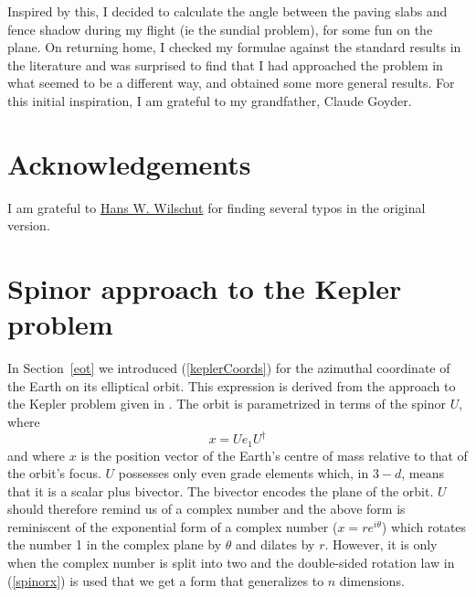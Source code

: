 \documentclass[12pt]{article}
\begin{document}
Inspired by this, I decided to calculate the angle between the paving slabs and fence shadow during my flight (ie the sundial problem), for some fun on the plane. On returning home, I checked my formulae against the standard results in the literature and was surprised to find that I had approached the problem in what seemed to be a different way, and obtained some more general results. For this initial inspiration, I am grateful to my grandfather, Claude Goyder.
%
\section*{Acknowledgements}
%
I am grateful to \href{https://sites.google.com/view/hanswilschut/home}{Hans W. Wilschut} for finding several typos in the original version.
%
\clearpage
%
\appendix 
\section{Spinor approach to the Kepler problem} \label{kepler}
%
In Section~\ref{eot} we introduced (\ref{keplerCoords}) for the azimuthal coordinate of the Earth on its elliptical orbit. This expression is derived from the approach to the Kepler problem given in \cite{GAbook}. The orbit is parametrized in terms of the spinor $U$, where
%
\begin{equation} \label{spinorx}
x = U e_1 U^\dag
\end{equation}
%
and where $x$ is the position vector of the Earth's centre of mass relative to that of the orbit's focus. $U$ possesses only even grade elements which, in $3-d$, means that it is a scalar plus bivector. The bivector encodes the plane of the orbit. $U$ should therefore remind us of a complex number and the above form is reminiscent of the exponential form of a complex number ($x = re^{i\theta}$) which rotates the number 1 in the complex plane by $\theta$ and dilates by $r$. However, it is only when the complex number is split into two and the double-sided rotation law in (\ref{spinorx}) is used that we get a form that generalizes to $n$ dimensions.
\end{document}
